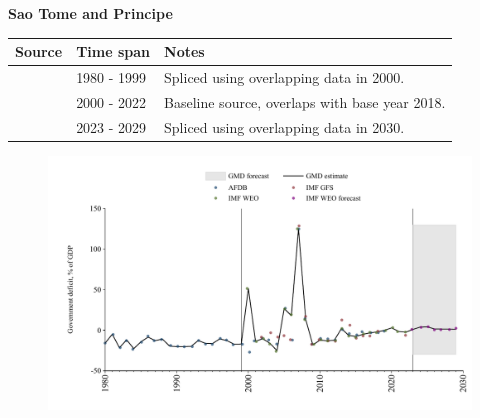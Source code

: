 \documentclass[12pt,a4paper,landscape]{article}
\begin{document}
\begin{adjustbox}{max totalsize={\paperwidth}{\paperheight},center}
\begin{minipage}[t][\textheight][t]{\textwidth}
\vspace*{0.5cm}
{}
\begin{center}
{\Large\bfseries Sao Tome and Principe}
\end{center}
\vspace{0.5cm}
\begin{table}[H]
\centering
\small
\begin{tabular}{|l|l|l|}
\hline
\textbf{Source} & \textbf{Time span} & \textbf{Notes} \\
\hline
\rowcolor{white}\cite{AFDB}& 1980 - 1999 &Spliced using overlapping data in 2000.\\
\rowcolor{lightgray}\cite{IMF_WEO}& 2000 - 2022 &Baseline source, overlaps with base year 2018.\\
\rowcolor{white}\cite{IMF_WEO_forecast}& 2023 - 2029 &Spliced using overlapping data in 2030.\\
\hline
\end{tabular}
\end{table}
\begin{figure}[H]
\centering
\includegraphics[width=\textwidth,height=0.6\textheight,keepaspectratio]{graphs/STP_govdef_GDP.pdf}
\end{figure}
\end{minipage}
\end{adjustbox}
\end{document}
